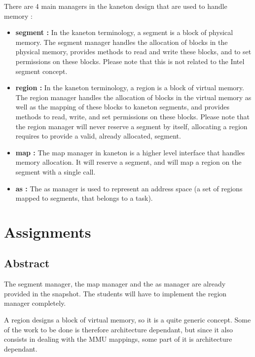 There are 4 main managers in the kaneton design that are used to handle memory :

\begin{itemize}
\item \textbf{segment :} In the kaneton terminology, a segment is a block of physical memory. The segment manager handles the allocation of blocks in the physical memory, provides methods to read and write these blocks, and to set permissions on these blocks. Please note that this is not related to the Intel segment concept.

\item \textbf{region :} In the kaneton terminology, a region is a block of virtual memory. The region manager handles the allocation of blocks in the virtual memory as well as the mapping of these blocks to kaneton segments, and provides methods to read, write, and set permissions on these blocks. Please note that the region manager will never reserve a segment by itself, allocating a region requires to provide a valid, already allocated, segment.

\item \textbf{map :} The map manager in kaneton is a higher level interface that handles memory allocation. It will reserve a segment, and will map a region on the segment with a single call.

\item \textbf{as :} The as manager is used to represent an address space (a set of regions mapped to segments, that belongs to a task).

\end{itemize}

%
%

\section{Assignments}

\subsection*{Abstract}

The segment manager, the map manager and the as manager are already provided in the snapshot. The students will have to implement the region manager completely.

A region designs a block of virtual memory, so it is a quite generic concept. Some of the work to be done is therefore architecture dependant, but since it also consists in dealing with the MMU mappings, some part of it is architecture dependant.

